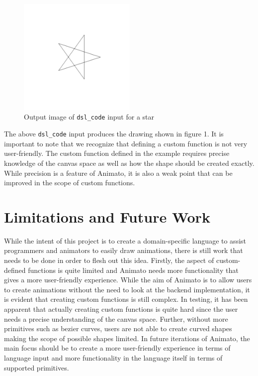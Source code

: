 \documentclass[acmsmall,screen]{acmart}
\begin{document}
\begin{center}
  \begin{figure}[!h]
    \includegraphics[width=0.5\textwidth]{images/star.png}
    \caption{Output image of \texttt{dsl\_code} input for a star}
  \end{figure}
\end{center}

The above \texttt{dsl\_code} input produces the drawing shown in figure 1.
It is important to note that we recognize that defining a custom function is not very user-friendly.
The custom function defined in the example requires precise knowledge of the canvas space as well as how the shape should be created exactly.
While precision is a feature of Animato, it is also a weak point that can be improved in the scope of custom functions.

\section{Limitations and Future Work}
While the intent of this project is to create a domain-specific language to assist programmers and animators to easily draw animations, there is still work that needs to be done in order to flesh out this idea.
Firstly, the aspect of custom-defined functions is quite limited and Animato needs more functionality that gives a more user-friendly experience.
While the aim of Animato is to allow users to create animations without the need to look at the backend implementation, it is evident that creating custom functions is still complex.
In testing, it has been apparent that actually creating custom functions is quite hard since the user needs a precise understanding of the canvas space.
Further, without more primitives such as bezier curves, users are not able to create curved shapes making the scope of possible shapes limited.
In future iterations of Animato, the main focus should be to create a more user-friendly experience in terms of language input and more functionality in the language itself in terms of supported primitives.
\end{document}
